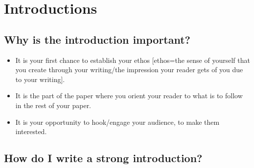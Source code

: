 

\chapter{Introductions}

\section {Why is the introduction important?}
 
\begin{itemize}
\item It is your first chance to establish your ethos [ethos=the sense of yourself that you create through your writing/the impression your reader gets of you due to your writing].
 
\item It is the part of the paper where you orient your reader to what is to follow in the rest of your paper.
 
\item It is your opportunity to hook/engage your audience, to make them interested.
\end{itemize}

\section{How do I write a strong introduction?}


